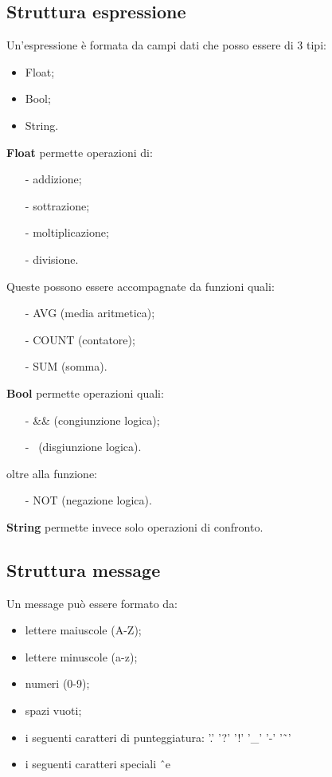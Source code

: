 \subsection{Struttura espressione}
Un'espressione \`e formata da campi dati che posso essere di 3 tipi:
\begin{itemize}
\item Float;
\item Bool;
\item String. 
\end{itemize}
\textbf{Float} permette operazioni di:
\begin{itemize}
\item[-] addizione;
\item[-] sottrazione;
\item[-] moltiplicazione;
\item[-] divisione.
\end{itemize}
Queste possono essere accompagnate da funzioni quali:
\begin{itemize}
\item[-] AVG (media aritmetica);
\item[-] COUNT (contatore);
\item[-] SUM (somma). 
\end{itemize}
\textbf{Bool} permette operazioni quali:
\begin{itemize}
\item[-] \&\& (congiunzione logica);
\item[-] \textbar\textbar\ (disgiunzione logica).
\end{itemize}
oltre alla funzione:
\begin{itemize}
\item[-] NOT (negazione logica). 
\end{itemize}
\textbf{String} permette invece solo operazioni di confronto.
\subsection{Struttura message}
Un message pu\`o essere formato da:
\begin{itemize}
\item lettere maiuscole (A-Z);
\item lettere minuscole (a-z);
\item numeri (0-9);
\item spazi vuoti;
\item i seguenti caratteri di punteggiatura: '.'  '?'  '!'  '\_'  '-'  '\~\ '
\item i seguenti caratteri speciali \^\ e \~ \\
\end{itemize}
